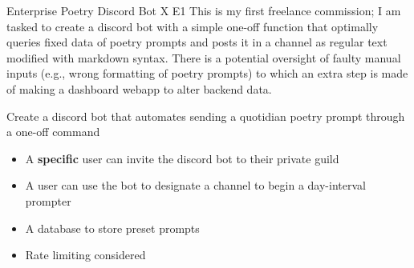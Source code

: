 \documentclass[7px]{article}
\begin{document}
\frontmatter
{Enterprise}
{Poetry Discord Bot}
{X}
{E1}
{This is my first freelance commission; I am tasked to create a discord bot with a simple one-off function that optimally queries fixed data of poetry prompts and posts it in a channel as regular text modified with markdown syntax. There is a potential oversight of faulty manual inputs (e.g., wrong formatting of poetry prompts) to which an extra step is made of making a dashboard webapp to alter backend data.}

\strategy
{
  Create a discord bot that automates sending a quotidian poetry prompt through a one-off command
}
{
  \begin{enumerate}
    \small
    \begin{itemize}[label=$\multimapdotinv$, leftmargin=1.7mm]
      \item A \textbf{specific} user can invite the discord bot to their private guild
      \item A user can use the bot to designate a channel to begin a day-interval prompter
      \item A database to store preset prompts
      \item Rate limiting considered
    \end{itemize}
    \normalsize
\end{enumerate}
}
\end{document}

